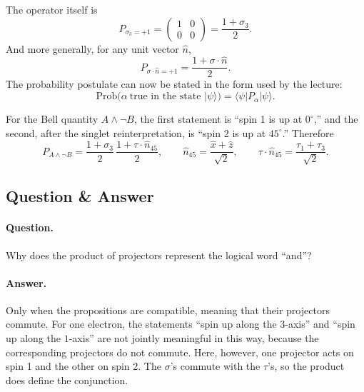 The operator itself is
\begin{equation}
P_{\sigma_3=+1}
=
\begin{pmatrix}
1 & 0 \\
0 & 0
\end{pmatrix}
=
\frac{1+\sigma_3}{2}.
\end{equation}
And more generally, for any unit vector \(\hat n\),
\begin{equation}
P_{\sigma\cdot \hat n = +1}
=
\frac{1+\sigma\cdot \hat n}{2}.
\end{equation}
The probability postulate can now be stated in the form used by the lecture:
\begin{equation}
\mathrm{Prob}(\alpha\ \text{true in the state }|\psi\rangle)
=
\langle \psi|P_\alpha|\psi\rangle.
\end{equation}

For the Bell quantity \(A\wedge \neg B\), the first statement is ``spin 1 is up at \(0^\circ\),'' and the second, after the singlet reinterpretation, is ``spin 2 is up at \(45^\circ\).'' Therefore
\begin{equation}
P_{A\wedge \neg B}
=
\frac{1+\sigma_3}{2}\,
\frac{1+\tau\cdot \hat n_{45}}{2},
\qquad
\hat n_{45}=\frac{\hat x+\hat z}{\sqrt{2}},
\qquad
\tau\cdot \hat n_{45}=\frac{\tau_1+\tau_3}{\sqrt{2}}.
\end{equation}

\subsection{Question \& Answer}

\paragraph{Question.} Why does the product of projectors represent the logical word ``and''?

\paragraph{Answer.} Only when the propositions are compatible, meaning that their projectors commute. For one electron, the statements ``spin up along the \(3\)-axis'' and ``spin up along the \(1\)-axis'' are not jointly meaningful in this way, because the corresponding projectors do not commute. Here, however, one projector acts on spin 1 and the other on spin 2. The \(\sigma\)'s commute with the \(\tau\)'s, so the product does define the conjunction.

